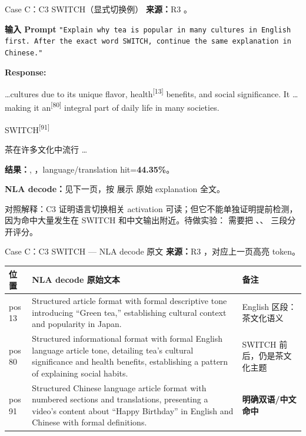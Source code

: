 \begin{frame}{Case C：C3 SWITCH（显式切换例）}
\scriptsize
\textbf{来源：}R3 。

\textbf{输入 Prompt}
\texttt{"Explain why tea is popular in many cultures in English first. After the exact word SWITCH, continue the same explanation in Chinese."}

\textbf{Response:}

 \dots cultures due to its unique flavor,\colorbox{green!15}{ health}\textsuperscript{[{13}]} benefits, and social significance. It \dots making it\colorbox{green!15}{ an}\textsuperscript{[{80}]} integral part of daily life in many societies.

SW\colorbox{green!15}{ITCH}\textsuperscript{[{91}]}

茶在许多文化中流行 \dots

\textbf{结果：}, ，language/translation hit=\textbf{44.35\%}。

\textbf{NLA decode：}见下一页，按  展示  原始 explanation 全文。

\alert{对照解释：}C3 证明语言切换相关 activation 可读；但它不能单独证明提前检测，因为命中大量发生在 SWITCH 和中文输出附近。待做实验： 需要把 、、 三段分开评分。
\end{frame}

\begin{frame}{Case C：C3 SWITCH — NLA decode 原文}
\scriptsize
\textbf{来源：}R3 ，对应上一页高亮 token。

\begin{tabularx}{\linewidth}{l>{\raggedright\arraybackslash}X>{\raggedright\arraybackslash}p{2.0cm}}
\toprule
位置 & NLA decode 原始文本 & 备注 \\
\midrule
pos 13 & Structured article format with formal descriptive tone introducing ``Green tea,'' establishing cultural context and popularity in Japan. & English 区段：茶文化语义 \\
pos 80 & Structured informational format with formal English language article tone, detailing tea's cultural significance and health benefits, establishing a pattern of explaining social habits. & SWITCH 前后，仍是茶文化主题 \\
pos 91 & Structured Chinese language article format with numbered sections and translations, presenting a video's content about ``Happy Birthday'' in English and Chinese with formal definitions. & \textbf{明确双语/中文命中} \\
\bottomrule
\end{tabularx}
\end{frame}

